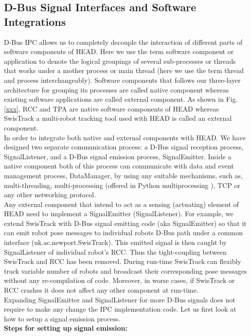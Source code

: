 \documentclass{ifacconf}
\begin{document}
\subsection{D-Bus Signal Interfaces and Software Integrations}
D-Bus IPC allows us to completely decouple the interaction of different parts of  software components of HEAD. Here we use the term software component or application to denote the logical groupings of several sub-processes or threads that works under a mother process or main thread (here we use the term thread and process interchangeably). Software components that follows our three-layer architecture for grouping its processes are called native component whereas existing software applications are called external component. As shown in  Fig. \ref{xxx},  RCC and TPA are native software components of HEAD whereas SwisTrack a multi-robot tracking tool \cite{xxx} used with HEAD is called an external component.\\
In order to integrate both native and external components with HEAD. We have designed two separate communication process: a D-Bus signal reception process, SignalListener, and a D-Bus signal emission process, SignalEmitter.  Inside a native component both of this process can communicate with data and event management process, DataManager, by using any suitable mechanisms, such as, multi-threading, multi-processing (offered in Python multiprocessing \footnotetext{}), TCP or any other networking protocol.\\
Any external component that intend to act as a sensing (actuating) element of HEAD need to implement a SignalEmitter (SignalListener). For example, we extend SwisTrack with D-Bus signal emitting code (aka SignalEmitter) so that it can emit robot pose messages to individual robots D-Bus path under a common interface (uk.ac.newport.SwisTrack). This emitted signal is then caught by SignalListener  of individual robot's RCC. Thus the tight-coupling between SwisTrack and RCC has been removed. During  run-time  SwisTrack can flexibly track variable number of robots and broadcast their corresponding pose messages without any re-compilation of code. Moreover, in worse cases, if SwisTrack or RCC crashes it does not affect any other component at run-time.\\
Expanding SignalEmitter and SignalListener for more D-Bus signals does not require to make any change the IPC implementation code. Let us first look at how to setup a signal emission process.\\
\textbf{Steps for setting up signal emission:}\\
\end{document}
